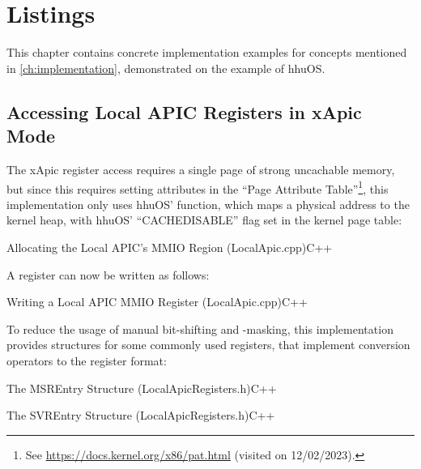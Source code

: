 \chapter{Listings}
\label{ch:listings}

This chapter contains concrete implementation examples for concepts mentioned in
\autoref{ch:implementation}, demonstrated on the example of hhuOS\@.

\clearpage %

\section{Accessing Local APIC Registers in xApic Mode}
\label{sec:apxxapicregacc}

The xApic register access requires a single page of strong uncachable memory, but since this
requires setting attributes in the ``Page Attribute Table''\footnote{See
  \url{https://docs.kernel.org/x86/pat.html} (visited on 12/02/2023).}, this implementation only uses
hhuOS'  function\cite[MemoryService.cpp]{hhuos}, which maps a physical address to the
kernel heap, with hhuOS' ``CACHE\textunderscore{}DISABLE'' flag set in the kernel page table:

\begin{codeblock}{Allocating the Local APIC's MMIO Region (LocalApic.cpp)}{C++}
\end{codeblock}

A register can now be written as follows:

\begin{codeblock}[label=lst:lapicmmiowrite]{Writing a Local APIC MMIO Register (LocalApic.cpp)}{C++}
\end{codeblock}

To reduce the usage of manual bit-shifting and -masking, this implementation provides structures
for some commonly used registers, that implement conversion operators to the register format:

\begin{codeblock}[label=lst:msrentry]{The MSREntry Structure (LocalApicRegisters.h)}{C++}
\end{codeblock}

\begin{codeblock}[label=lst:svrentry]{The SVREntry Structure (LocalApicRegisters.h)}{C++}
\end{codeblock}


